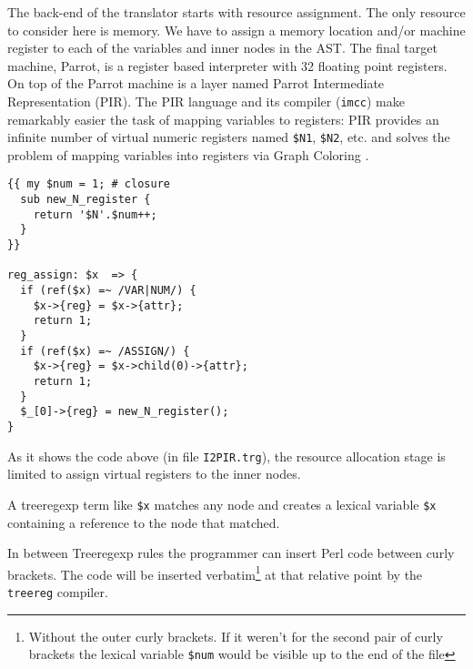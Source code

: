 The back-end of the translator starts with resource assignment.
The only resource to consider here is memory. We have to assign
a memory location and/or machine register to each of the variables and inner nodes
in the AST. The final target machine, Parrot, is a register based 
interpreter with 32 floating point registers. On top of the Parrot
machine is a layer named Parrot Intermediate Representation (PIR).
The PIR language and its compiler (\verb|imcc|) make remarkably easier 
the task of mapping variables to registers:
PIR provides an infinite number of virtual
numeric registers named \verb|$N1|, \verb|$N2|, etc. and solves
the problem of mapping variables into registers via Graph Coloring
\cite{briggs98register}.

\begin{verbatim}
{{ my $num = 1; # closure
  sub new_N_register {
    return '$N'.$num++;
  }
}}

reg_assign: $x  => {
  if (ref($x) =~ /VAR|NUM/) {
    $x->{reg} = $x->{attr};
    return 1;
  }
  if (ref($x) =~ /ASSIGN/) {
    $x->{reg} = $x->child(0)->{attr};
    return 1;
  }
  $_[0]->{reg} = new_N_register();
}
\end{verbatim}
As it shows the code above (in file \verb|I2PIR.trg|), 
the resource allocation stage
is limited to assign virtual registers
to the inner nodes. 

A treeregexp term like \verb|$x| matches any node
and creates a lexical variable \verb|$x|
containing a reference to the node that matched.

In between Treeregexp rules the programmer can insert 
Perl code between curly brackets. 
The code will be inserted verbatim\footnote{Without 
the outer curly brackets.
If it weren't for the second pair of curly brackets
the lexical variable {\tt \$num} would be visible
up to the end of the file
} at that relative point by the \verb|treereg|
compiler. 

